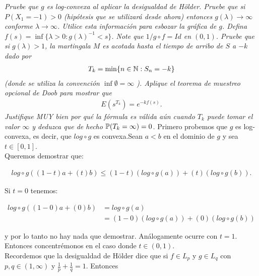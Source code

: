 \emph{
    Pruebe que $g$ es log-convexa al aplicar la desigualdad de H\"older. Pruebe que si $P(X_1=-1)>0$ (hip\'otesis que se utilizar\'a desde ahora) 
    entonces $g(\lambda)\to\infty$ conforme $\lambda\to\infty$. Utilice esta informaci\'on para esbozar la gr\'afica de $g$. 
    Defina $ f(s)=\inf \{ \lambda>0:g(\lambda)^{-1} < s\} $. Note que $1/g\circ f=Id$ en $(0,1)$. Pruebe que si $g(\lambda)>1$, 
    la martingala $M$ es acotada hasta el tiempo de arribo de $S$ a $-k$ dado por 
    \null
    \begin{align}
        T_k =\min \{n\in\mathbb{N}:S_n=-k\} 
    \end{align}
    \null
    (donde se utiliza la convenci\'on $\inf\emptyset=\infty$ ). Aplique el teorema de muestreo opcional de Doob para mostrar que 
    \null
    \begin{align}
        E(s^{T_k})=e^{-k f(s)}.
    \end{align}
    \null
    Justifique MUY bien por qu\'e la f\'ormula es válida aún cuando $T_k$ puede tomar el valor $\infty$ y deduzca que de hecho 
    $ \mathbb{P}  (T_k=\infty)=0$.
}
\afterstatement
    Primero probemos que $g$ es log-convexa, es decir, que $log \circ g$ es convexa.Sean $a < b$ en el dominio de $g$ 
    y sea $t \in [0, 1]$.\\
    
    Queremos demostrar que:
    
    \begin{align}
            log\circ g ((1-t)a + (t)b) \leq (1-t)(log\circ g (a)) + (t)(log\circ g (b)).
    \end{align}
    
    Si $t=0$ tenemos:
    
    \begin{align}
        log\circ g ((1-0)a + (0)b)  &= log\circ g (a) \\
                                    &= (1-0)(log\circ g (a)) + (0)(log\circ g (b))
    \end{align}
    
    y por lo tanto no hay nada que demostrar. Análogamente ocurre con $t=1$.\\
    
    Entonces concentrémonos en el caso donde $t\in (0, 1)$.\\
    
    Recordemos que la desigualdad de Hölder dice que si $f \in L_p$ y $g \in L_q$ con 
    $p,q \in (1,\infty)$ y $\frac{1}{p} + \frac{1}{q} = 1$. Entonces
                
